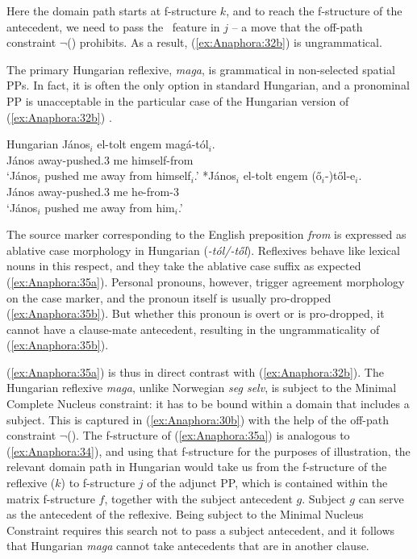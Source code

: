 \documentclass[output=paper,hidelinks]{langscibook}
\begin{document}
\noindent Here the domain path starts at f-structure $k$, and to reach the f-structure of the antecedent, we need to pass the \PRED\ feature in $j$ – a move that the off-path constraint $\neg$(\RIGHT\PRED) prohibits. As a result, (\ref{ex:Anaphora:32b}) is ungrammatical.

The primary Hungarian reflexive, \emph{maga}, is grammatical in non-selected spatial PPs. In fact, it is often the only option in standard Hungarian, and a pronominal PP is unacceptable in the particular case of the Hungarian version of (\ref{ex:Anaphora:32b}) \citep{Rakosi2010}.

\ea\label{ex:Anaphora:35} Hungarian
\ea\label{ex:Anaphora:35a}\gll
János$_i$  el-tolt    engem  magá-tól$_i$.\\
 János away-pushed.{3\SG} me  himself-from\\
 \glt`János$_i$ pushed me away from himself$_i$.'
\ex\label{ex:Anaphora:35b}\gll
*János$_i$ el-tolt   engem  (ő$_i$-)től-e$_i$.\\
 János away-pushed.{3\SG} me  he-from-{3\SG}\\
\glt `János$_i$ pushed me away from him$_i$.'
\z\z

\noindent The source marker corresponding to the English preposition \emph{from} is  expressed as ablative case morphology in Hungarian (\emph{-tól/-től}). Reflexives behave like lexical nouns in this respect, and they take the ablative case suffix as expected (\ref{ex:Anaphora:35a}). Personal pronouns, however, trigger agreement morphology on the case marker, and the pronoun itself is usually pro-dropped (\ref{ex:Anaphora:35b}). But whether this pronoun is overt or is pro-dropped, it cannot have a clause-mate antecedent, resulting in the ungrammaticality of (\ref{ex:Anaphora:35b}).

(\ref{ex:Anaphora:35a}) is thus in direct contrast with (\ref{ex:Anaphora:32b}). The Hungarian reflexive \emph{maga}, unlike Norwegian \emph{seg selv}, is subject to the Minimal Complete Nucleus constraint: it has to be bound within a domain that includes a subject. This is captured in (\ref{ex:Anaphora:30b}) with the help of the off-path constraint  $\neg$(\RIGHT\SUBJ). The f-structure of (\ref{ex:Anaphora:35a}) is analogous to (\ref{ex:Anaphora:34}), and using that f-structure for the purposes of illustration, the relevant domain path in Hungarian would take us from the f-structure of the reflexive ($k$) to f-structure $j$ of the adjunct PP, which is contained within the matrix f-structure $f$, together with the subject antecedent $g$. Subject $g$ can serve as the antecedent of the reflexive. Being subject to the Minimal Nucleus Constraint requires this search not to pass a subject antecedent, and it follows that Hungarian \emph{maga} cannot take antecedents that are in another clause.
\end{document}

